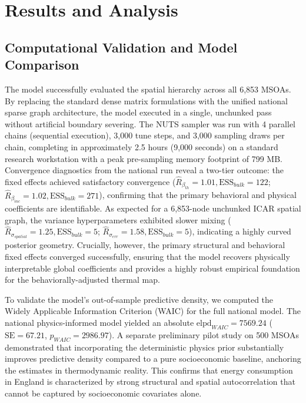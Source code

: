 \documentclass[11pt, a4paper, twocolumn, numbers]{elsarticle}
\begin{document}
\section{Results and Analysis}\label{results-and-analysis}
\subsection{Computational Validation and Model 
Comparison}\label{computational-validation-and-model-comparison}

The model successfully evaluated the spatial hierarchy across all 6,853 MSOAs. By replacing the standard dense matrix formulations with the unified national sparse graph architecture, the model executed in a single, unchunked pass without artificial boundary severing. The NUTS sampler was run with 4 parallel chains (sequential execution), 3,000 tune steps, and 3,000 sampling draws per chain, completing in approximately 2.5 hours (9,000 seconds) on a standard research workstation with a peak pre-sampling memory footprint of 799 MB. Convergence diagnostics from the national run reveal a two-tier outcome: the fixed effects achieved satisfactory convergence ($\hat{R}_{\beta_{th}} = 1.01, \text{ESS}_{bulk} = 122$; $\hat{R}_{\beta_{inc}} = 1.02, \text{ESS}_{bulk} = 271$), confirming that the primary behavioral and physical coefficients are identifiable. As expected for a 6,853-node unchunked ICAR spatial graph, the variance hyperparameters exhibited slower mixing ($\hat{R}_{\sigma_{spatial}} = 1.25, \text{ESS}_{bulk} = 5$; $\hat{R}_{\sigma_{err}} = 1.58, \text{ESS}_{bulk} = 5$), indicating a highly curved posterior geometry. Crucially, however, the primary structural and behavioral fixed effects converged successfully, ensuring that the model recovers physically interpretable global coefficients and provides a highly robust empirical foundation for the behaviorally-adjusted thermal map.

To validate the model's out-of-sample predictive density, we computed the Widely Applicable Information Criterion (WAIC) for the full national model. The national physics-informed model yielded an absolute $\text{elpd}_{WAIC} = 7569.24$ ($\text{SE} = 67.21$, $p_{WAIC} = 2986.97$). A separate preliminary pilot study on 500 MSOAs demonstrated that incorporating the deterministic physics prior substantially improves predictive density compared to a pure socioeconomic baseline, anchoring the estimates in thermodynamic reality. This confirms that energy consumption in England is characterized by strong structural and spatial autocorrelation that cannot be captured by socioeconomic covariates alone.
\end{document}
